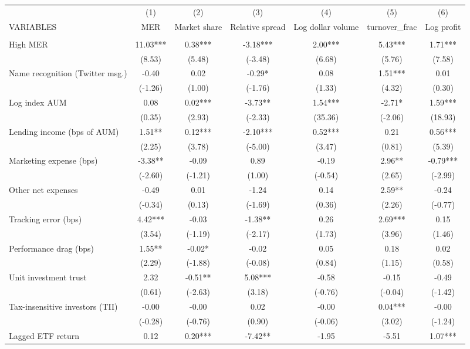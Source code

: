 \documentclass[]{article}
\begin{document}
\begin{tabular}{lcccccc} \hline
 & (1) & (2) & (3) & (4) & (5) & (6) \\
VARIABLES & MER & Market share & Relative spread & Log dollar volume & turnover\_frac & Log profit \\ \hline
 &  &  &  &  &  &  \\
High MER & 11.03*** & 0.38*** & -3.18*** & 2.00*** & 5.43*** & 1.71*** \\
 & (8.53) & (5.48) & (-3.48) & (6.68) & (5.76) & (7.58) \\
Name recognition (Twitter msg.) & -0.40 & 0.02 & -0.29* & 0.08 & 1.51*** & 0.01 \\
 & (-1.26) & (1.00) & (-1.76) & (1.33) & (4.32) & (0.30) \\
Log index AUM & 0.08 & 0.02*** & -3.73** & 1.54*** & -2.71* & 1.59*** \\
 & (0.35) & (2.93) & (-2.33) & (35.36) & (-2.06) & (18.93) \\
Lending income (bps of AUM) & 1.51** & 0.12*** & -2.10*** & 0.52*** & 0.21 & 0.56*** \\
 & (2.25) & (3.78) & (-5.00) & (3.47) & (0.81) & (5.39) \\
Marketing expense (bps) & -3.38** & -0.09 & 0.89 & -0.19 & 2.96** & -0.79*** \\
 & (-2.60) & (-1.21) & (1.00) & (-0.54) & (2.65) & (-2.99) \\
Other net expenses & -0.49 & 0.01 & -1.24 & 0.14 & 2.59** & -0.24 \\
 & (-0.34) & (0.13) & (-1.69) & (0.36) & (2.26) & (-0.77) \\
Tracking error (bps) & 4.42*** & -0.03 & -1.38** & 0.26 & 2.69*** & 0.15 \\
 & (3.54) & (-1.19) & (-2.17) & (1.73) & (3.96) & (1.46) \\
Performance drag (bps) & 1.55** & -0.02* & -0.02 & 0.05 & 0.18 & 0.02 \\
 & (2.29) & (-1.88) & (-0.08) & (0.84) & (1.15) & (0.58) \\
Unit investment trust & 2.32 & -0.51** & 5.08*** & -0.58 & -0.15 & -0.49 \\
 & (0.61) & (-2.63) & (3.18) & (-0.76) & (-0.04) & (-1.42) \\
Tax-insensitive investors (TII) & -0.00 & -0.00 & 0.02 & -0.00 & 0.04*** & -0.00 \\
 & (-0.28) & (-0.76) & (0.90) & (-0.06) & (3.02) & (-1.24) \\
Lagged ETF return & 0.12 & 0.20*** & -7.42** & -1.95 & -5.51 & 1.07*** \\

\end{tabular}
\end{document}
